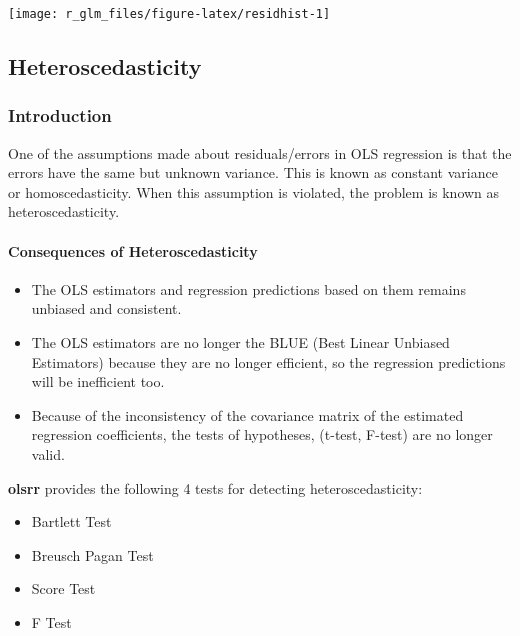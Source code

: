 \documentclass[
]{article}
\providecommand{\tightlist}{%
  \setlength{\itemsep}{0pt}\setlength{\parskip}{0pt}}
\begin{document}
\begin{center}\texttt{[image: r\_glm\_files/figure-latex/residhist-1]} \end{center}

\hypertarget{heteroscedasticity}{%
\subsection{Heteroscedasticity}\label{heteroscedasticity}}

\hypertarget{introduction-2}{%
\subsubsection{Introduction}\label{introduction-2}}

One of the assumptions made about residuals/errors in OLS regression is
that the errors have the same but unknown variance. This is known as
constant variance or homoscedasticity. When this assumption is violated,
the problem is known as heteroscedasticity.

\hypertarget{consequences-of-heteroscedasticity}{%
\paragraph{Consequences of
Heteroscedasticity}\label{consequences-of-heteroscedasticity}}

\begin{itemize}
\tightlist
\item
  The OLS estimators and regression predictions based on them remains
  unbiased and consistent.
\item
  The OLS estimators are no longer the BLUE (Best Linear Unbiased
  Estimators) because they are no longer efficient, so the regression
  predictions will be inefficient too.
\item
  Because of the inconsistency of the covariance matrix of the estimated
  regression coefficients, the tests of hypotheses, (t-test, F-test) are
  no longer valid.
\end{itemize}

\textbf{olsrr} provides the following 4 tests for detecting
heteroscedasticity:

\begin{itemize}
\tightlist
\item
  Bartlett Test
\item
  Breusch Pagan Test
\item
  Score Test
\item
  F Test
\end{itemize}
\end{document}
